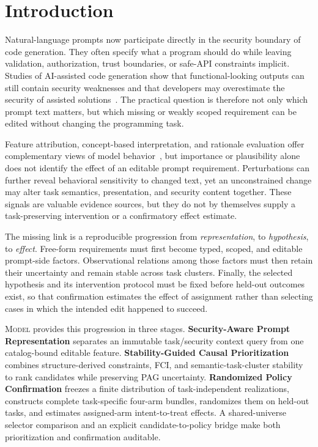 \documentclass[acmsmall,screen,review,anonymous]{acmart}
\newcommand{\model}{\textsc{Model}\xspace}
\begin{document}
\section{Introduction}

Natural-language prompts now participate directly in the security boundary of
code generation. They often specify what a program should do while leaving
validation, authorization, trust boundaries, or safe-API constraints implicit.
Studies of AI-assisted code generation show that functional-looking outputs
can still contain security weaknesses and that developers may overestimate the
security of assisted solutions~\cite{pearce2022copilot,perry2023assistants}.
The practical question is therefore not only which prompt text matters, but
which missing or weakly scoped requirement can be edited without changing the
programming task.

Feature attribution, concept-based interpretation, and rationale evaluation
offer complementary views of model
behavior~\cite{sundararajan2017integrated,kim2018tcav,lundberg2017shap,deyoung2020eraser},
but importance or plausibility alone does not identify the effect of an
editable prompt requirement. Perturbations can further reveal behavioral
sensitivity to changed text, yet an unconstrained change may alter task
semantics, presentation, and security content together. These signals are
valuable evidence sources, but they do not by themselves supply a
task-preserving intervention or a confirmatory effect estimate.

The missing link is a reproducible progression from \emph{representation}, to
\emph{hypothesis}, to \emph{effect}. Free-form requirements must first become
typed, scoped, and editable prompt-side factors. Observational relations among
those factors must then retain their uncertainty and remain stable across task
clusters. Finally, the selected hypothesis and its intervention protocol must
be fixed before held-out outcomes exist, so that confirmation estimates the
effect of assignment rather than selecting cases in which the intended edit
happened to succeed.

\model provides this progression in three stages.
\textbf{Security-Aware Prompt Representation} separates an immutable
task/security context query from one catalog-bound editable feature.
\textbf{Stability-Guided Causal Prioritization} combines structure-derived
constraints, FCI, and semantic-task-cluster stability to rank candidates while
preserving PAG uncertainty.
\textbf{Randomized Policy Confirmation} freezes a finite distribution of
task-independent realizations, constructs complete task-specific four-arm
bundles, randomizes them on held-out tasks, and estimates assigned-arm
intent-to-treat effects. A shared-universe selector comparison and an explicit
candidate-to-policy bridge make both prioritization and confirmation auditable.
\end{document}
